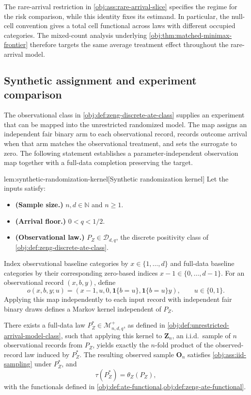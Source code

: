 \documentclass[11pt]{article}
\begin{document}
The rare-arrival restriction in \cref{obj:ass:rare-arrival-slice} specifies the regime for the risk comparison, while this identity fixes its estimand. In particular, the null-cell convention gives a total cell functional across laws with different occupied categories. The mixed-count analysis underlying \cref{obj:thm:matched-minimax-frontier} therefore targets the same average treatment effect throughout the rare-arrival model.

\subsection{Synthetic assignment and experiment comparison}

The observational class in \cref{obj:def:zeng-discrete-ate-class} supplies an experiment that can be mapped into the unrestricted randomized model. The map assigns an independent fair binary arm to each observational record, records outcome arrival when that arm matches the observational treatment, and sets the surrogate to zero. The following statement establishes a parameter-independent observation map together with a full-data completion preserving the target.

\begin{lemmav}{lem:synthetic-randomization-kernel}[Synthetic randomization kernel]
Let the inputs satisfy:
\begin{itemize}
\item \textbf{(Sample size.)} \(n,d\in\mathbb N\) and \(n\ge1\).
\item \textbf{(Arrival floor.)} \(0<q<1/2\).
\item \textbf{(Observational law.)} \(P_Z\in\mathcal D_{d,q}\), the discrete positivity class of \cref{obj:def:zeng-discrete-ate-class}.
\end{itemize}
Index observational baseline categories by \(x\in\{1,\ldots,d\}\) and full-data baseline categories by their corresponding zero-based indices \(x-1\in\{0,\ldots,d-1\}\). For an observational record \((x,b,y)\), define
\[
o(x,b,y;u)
=
\left(x-1,u,0,\mathbf 1\{b=u\},\mathbf 1\{b=u\}y\right),
\qquad u\in\{0,1\}.
\]
Applying this map independently to each input record with independent fair binary draws defines a Markov kernel independent of \(P_Z\).

There exists a full-data law \(P_Z^*\in\mathcal M^{+}_{n,d,q}\), as defined in \cref{obj:def:unrestricted-arrival-model-class}, such that applying this kernel to \(\mathbf Z_n\), an i.i.d.\ sample of \(n\) observational records from \(P_Z\), yields exactly the \(n\)-fold product of the observed-record law induced by \(P_Z^*\). The resulting observed sample \(\mathbf O_n\) satisfies \cref{obj:ass:iid-sampling} under \(P_Z^*\), and
\[
\tau(P_Z^*)=\theta_Z(P_Z),
\]
with the functionals defined in \cref{obj:def:ate-functional,obj:def:zeng-ate-functional}.
\end{lemmav}
\end{document}
